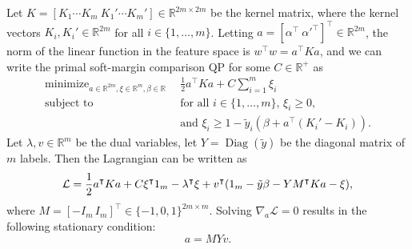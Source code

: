 \documentclass{article}
\newcommand{\RR}{\mathbb R}
\DeclareMathOperator*{\Diag}{Diag}
\DeclareMathOperator*{\minimize}{minimize}
\begin{document}
Let $K=[K_1\cdots K_m\ K_1'\cdots K_m']\in\RR^{2m\times 2m}$ be the
kernel matrix, where the kernel vectors $K_i,K_i'\in\RR^{2m}$ for all
$i\in\{1, \dots, m\}$.
Letting $a=[\alpha^\intercal\
\alpha'^\intercal]^\intercal\in\RR^{2m}$, the norm of the linear
function in the feature space is $w^\intercal w = a^\intercal K a$,
and we can write the primal soft-margin comparison QP for some
$C\in\RR^+$ as
\begin{equation}
  \begin{aligned}
      \minimize_{a\in\RR^{2m},\xi\in\RR^m,\beta\in\RR}\ \ & 
      \frac 1 2 a^\intercal K a + C\sum_{i=1}^m \xi_i \\
      \text{subject to}\ \ & 
      \text{for all $i\in\{1,\dots,m\}$, }
      \xi_i \geq 0,\\
      &\text{and }
      \xi_i \geq 1-\tilde y_i(\beta + a^\intercal (K_i'-K_i)).
  \end{aligned}
\end{equation}
Let $\lambda, v\in\RR^m$ be the dual variables, let $Y=\Diag(\tilde
y)$ be the diagonal matrix of $m$ labels. Then the Lagrangian can be
written as
\begin{equation}
  \label{eq:lagrangian}
  \mathcal L = \frac 1 2 a^\intercal K a + C\xi^\intercal 1_{m}\\
  -\lambda^\intercal \xi + v^\intercal(1_m - \tilde y\beta - Y M^\intercal K a - \xi),
\end{equation}
where $M=[-I_m \, I_m]^\intercal\in\{-1,0,1\}^{2m\times m}$. Solving
$\nabla_a \mathcal L=0$ results in the following stationary condition:
\begin{equation}
  \label{eq:stationarity}
  a = M Y v.
\end{equation}
\end{document}
